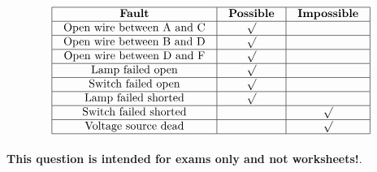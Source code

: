 

$$\vbox{\offinterlineskip
\halign{\strut
\vrule \quad\hfil # \ \hfil & 
\vrule \quad\hfil # \ \hfil & 
\vrule \quad\hfil # \ \hfil \vrule \cr
\noalign{\hrule}
%
{\bf Fault} & {\bf Possible} & {\bf Impossible} \cr
%
\noalign{\hrule}
%
Open wire between A and C & $\surd$ &  \cr
%
\noalign{\hrule}
%
Open wire between B and D & $\surd$ &  \cr
%
\noalign{\hrule}
%
Open wire between D and F & $\surd$ &  \cr
%
\noalign{\hrule}
%
Lamp failed open & $\surd$ &  \cr
%
\noalign{\hrule}
%
Switch failed open & $\surd$ &  \cr
%
\noalign{\hrule}
%
Lamp failed shorted & $\surd$ &  \cr
%
\noalign{\hrule}
%
Switch failed shorted &  & $\surd$ \cr
%
\noalign{\hrule}
%
Voltage source dead &  & $\surd$ \cr
%
\noalign{\hrule}
} %
}$$ %








{\bf This question is intended for exams only and not worksheets!}.


